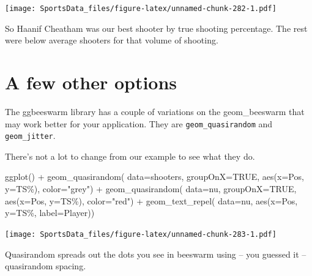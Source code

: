 \documentclass[
]{book}
\newenvironment{Shaded}{\begin{snugshade}}{\end{snugshade}}
\newcommand{\AttributeTok}[1]{\textcolor[rgb]{0.77,0.63,0.00}{#1}}
\newcommand{\ConstantTok}[1]{\textcolor[rgb]{0.00,0.00,0.00}{#1}}
\newcommand{\FunctionTok}[1]{\textcolor[rgb]{0.00,0.00,0.00}{#1}}
\newcommand{\NormalTok}[1]{#1}
\newcommand{\SpecialCharTok}[1]{\textcolor[rgb]{0.00,0.00,0.00}{#1}}
\newcommand{\StringTok}[1]{\textcolor[rgb]{0.31,0.60,0.02}{#1}}
\begin{document}
\texttt{[image: SportsData\_files/figure-latex/unnamed-chunk-282-1.pdf]}

So Haanif Cheatham was our best shooter by true shooting percentage. The rest were below average shooters for that volume of shooting.

\hypertarget{a-few-other-options}{%
\section{A few other options}\label{a-few-other-options}}

The ggbeeswarm library has a couple of variations on the geom\_beeswarm that may work better for your application. They are \texttt{geom\_quasirandom} and \texttt{geom\_jitter}.

There's not a lot to change from our example to see what they do.

\begin{Shaded}
\begin{Highlighting}[]
\FunctionTok{ggplot}\NormalTok{() }\SpecialCharTok{+} 
  \FunctionTok{geom\_quasirandom}\NormalTok{(}
    \AttributeTok{data=}\NormalTok{shooters, }
    \AttributeTok{groupOnX=}\ConstantTok{TRUE}\NormalTok{, }
    \FunctionTok{aes}\NormalTok{(}\AttributeTok{x=}\NormalTok{Pos, }\AttributeTok{y=}\StringTok{\textasciigrave{}}\AttributeTok{TS\%}\StringTok{\textasciigrave{}}\NormalTok{), }\AttributeTok{color=}\StringTok{"grey"}\NormalTok{) }\SpecialCharTok{+} 
  \FunctionTok{geom\_quasirandom}\NormalTok{(}
    \AttributeTok{data=}\NormalTok{nu, }
    \AttributeTok{groupOnX=}\ConstantTok{TRUE}\NormalTok{, }
    \FunctionTok{aes}\NormalTok{(}\AttributeTok{x=}\NormalTok{Pos, }\AttributeTok{y=}\StringTok{\textasciigrave{}}\AttributeTok{TS\%}\StringTok{\textasciigrave{}}\NormalTok{), }\AttributeTok{color=}\StringTok{"red"}\NormalTok{) }\SpecialCharTok{+} 
  \FunctionTok{geom\_text\_repel}\NormalTok{(}
    \AttributeTok{data=}\NormalTok{nu, }
    \FunctionTok{aes}\NormalTok{(}\AttributeTok{x=}\NormalTok{Pos, }\AttributeTok{y=}\StringTok{\textasciigrave{}}\AttributeTok{TS\%}\StringTok{\textasciigrave{}}\NormalTok{, }\AttributeTok{label=}\NormalTok{Player))}
\end{Highlighting}
\end{Shaded}

\texttt{[image: SportsData\_files/figure-latex/unnamed-chunk-283-1.pdf]}

Quasirandom spreads out the dots you see in beeswarm using -- you guessed it -- quasirandom spacing.
\end{document}
